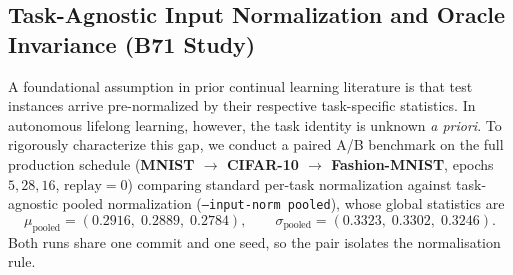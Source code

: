 \documentclass[11pt, a4paper]{article}
\begin{document}
\begin{table}[h]
\centering
\caption{\textbf{Autonomous Route Accuracy Breakdown at Stage 3.} Demonstrates exact destination breakdown for test queries evaluated without task labels.}
\label{tab:cl_route_breakdown}
\small
{}
\end{table}

\subsection{Task-Agnostic Input Normalization and Oracle Invariance (B71 Study)}
\label{sec:input_norm_ablation}

A foundational assumption in prior continual learning literature is that test instances arrive pre-normalized by their respective task-specific statistics. In autonomous lifelong learning, however, the task identity is unknown \emph{a priori}. To rigorously characterize this gap, we conduct a paired A/B benchmark on the full production schedule (\textbf{MNIST $\to$ CIFAR-10 $\to$ Fashion-MNIST}, epochs $5, 28, 16$, $\text{replay}=0$) comparing standard per-task normalization against task-agnostic pooled normalization (\texttt{--input-norm pooled}), whose global statistics are
\[
    \mu_{\text{pooled}} = (0.2916,\; 0.2889,\; 0.2784), \qquad
    \sigma_{\text{pooled}} = (0.3323,\; 0.3302,\; 0.3246).
\]
Both runs share one commit and one seed, so the pair isolates the normalisation rule.
\end{document}
